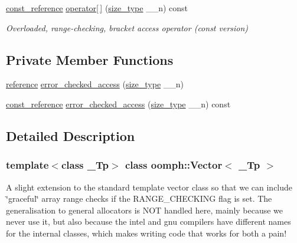 \begin{DoxyCompactItemize}
\item 
\hyperlink{classoomph_1_1Vector_ad126afbb3b115ef9dce224cf33c71428}{const\+\_\+reference} \hyperlink{classoomph_1_1Vector_a94d7a51d16e5792dd770e5a0ad7e7f89}{operator\mbox{[}$\,$\mbox{]}} (\hyperlink{classoomph_1_1Vector_a8ad2a43bd51f6bf2a981dd4e4e4247f5}{size\+\_\+type} \+\_\+\+\_\+n) const
\begin{DoxyCompactList}\small\item\em Overloaded, range-\/checking, bracket access operator (const version) \end{DoxyCompactList}\end{DoxyCompactItemize}
\subsection*{Private Member Functions}
\begin{DoxyCompactItemize}
\item 
\hyperlink{classoomph_1_1Vector_a7bd8c89b884168f3ecc358acc501d356}{reference} \hyperlink{classoomph_1_1Vector_ac0b7cb9144acb726a6e1955532607883}{error\+\_\+checked\+\_\+access} (\hyperlink{classoomph_1_1Vector_a8ad2a43bd51f6bf2a981dd4e4e4247f5}{size\+\_\+type} \+\_\+\+\_\+n)
\item 
\hyperlink{classoomph_1_1Vector_ad126afbb3b115ef9dce224cf33c71428}{const\+\_\+reference} \hyperlink{classoomph_1_1Vector_a8c17ec5380c2056eacc506490fe386e9}{error\+\_\+checked\+\_\+access} (\hyperlink{classoomph_1_1Vector_a8ad2a43bd51f6bf2a981dd4e4e4247f5}{size\+\_\+type} \+\_\+\+\_\+n) const
\end{DoxyCompactItemize}


\subsection{Detailed Description}
\subsubsection*{template$<$class \+\_\+\+Tp$>$\newline
class oomph\+::\+Vector$<$ \+\_\+\+Tp $>$}

A slight extension to the standard template vector class so that we can include \char`\"{}graceful\char`\"{} array range checks if the R\+A\+N\+G\+E\+\_\+\+C\+H\+E\+C\+K\+I\+NG flag is set. The generalisation to general allocators is N\+OT handled here, mainly because we never use it, but also because the intel and gnu compilers have different names for the internal classes, which makes writing code that works for both a pain! 

